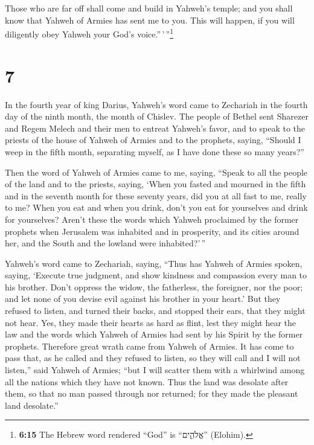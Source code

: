  Those who are far off shall come and build in Yahweh's
temple; and you shall know that Yahweh of Armies has sent me to you.
This will happen, if you will diligently obey Yahweh your God's
voice.''\,'\,''\footnote{\textbf{6:15} The Hebrew word rendered ``God''
  is ``אֱלֹהִ֑ים'' (Elohim).}

\hypertarget{section-6}{%
\section{7}\label{section-6}}

 In the fourth year of king Darius, Yahweh's word came to
Zechariah in the fourth day of the ninth month, the month of Chislev.
 The people of Bethel sent Sharezer and Regem Melech and
their men to entreat Yahweh's favor,  and to speak to the
priests of the house of Yahweh of Armies and to the prophets, saying,
``Should I weep in the fifth month, separating myself, as I have done
these so many years?''

 Then the word of Yahweh of Armies came to me, saying,
 ``Speak to all the people of the land and to the priests,
saying, `When you fasted and mourned in the fifth and in the seventh
month for these seventy years, did you at all fast to me, really to me?
 When you eat and when you drink, don't you eat for
yourselves and drink for yourselves?  Aren't these the
words which Yahweh proclaimed by the former prophets when Jerusalem was
inhabited and in prosperity, and its cities around her, and the South
and the lowland were inhabited?'\,''

 Yahweh's word came to Zechariah, saying, 
``Thus has Yahweh of Armies spoken, saying, `Execute true judgment, and
show kindness and compassion every man to his brother. 
Don't oppress the widow, the fatherless, the foreigner, nor the poor;
and let none of you devise evil against his brother in your heart.'
 But they refused to listen, and turned their backs, and
stopped their ears, that they might not hear.  Yes, they
made their hearts as hard as flint, lest they might hear the law and the
words which Yahweh of Armies had sent by his Spirit by the former
prophets. Therefore great wrath came from Yahweh of Armies.
 It has come to pass that, as he called and they refused
to listen, so they will call and I will not listen,'' said Yahweh of
Armies;  ``but I will scatter them with a whirlwind among
all the nations which they have not known. Thus the land was desolate
after them, so that no man passed through nor returned; for they made
the pleasant land desolate.''

